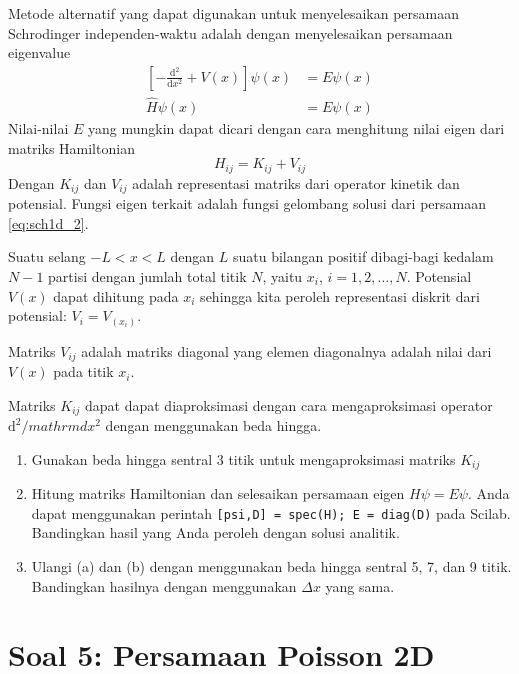 \documentclass[12pt,bahasa]{article}
\begin{document}
Metode alternatif
yang dapat digunakan untuk menyelesaikan persamaan
Schrodinger independen-waktu adalah dengan menyelesaikan
persamaan eigenvalue
\begin{align}
\left[-\frac{\mathrm{d}^2}{\mathrm{d}x^2} + V(x)\right]\psi(x) & = E\psi(x) \\
\hat{H}\psi(x) & = E \psi(x)
\end{align}
Nilai-nilai $E$ yang mungkin dapat dicari dengan cara menghitung
nilai eigen dari matriks Hamiltonian 
\begin{equation}
H_{ij} = K_{ij} + V_{ij}
\end{equation}
Dengan $K_{ij}$ dan $V_{ij}$ adalah representasi matriks dari operator
kinetik dan potensial.
Fungsi eigen terkait adalah fungsi gelombang solusi dari
persamaan \eqref{eq:sch1d_2}.

Suatu selang $-L < x < L$ dengan $L$ suatu bilangan positif
dibagi-bagi kedalam $N-1$ partisi dengan jumlah total titik $N$,
yaitu $x_{i}$, $i = 1, 2, \ldots, N$.
Potensial $V(x)$ dapat dihitung pada $x_{i}$ sehingga
kita peroleh representasi diskrit dari potensial:
$V_{i} = V_(x_{i})$.

Matriks $V_{ij}$ adalah matriks diagonal yang elemen diagonalnya adalah
nilai dari $V(x)$ pada titik $x_{i}$.

Matriks $K_{ij}$ dapat
dapat diaproksimasi dengan cara mengaproksimasi operator $\mathrm{d}^2/mathrm{d}x^2$
dengan menggunakan beda hingga.

\begin{enumerate}[label=(\alph*)]
\item Gunakan beda hingga sentral 3 titik untuk mengaproksimasi matriks $K_{ij}$
\item Hitung matriks Hamiltonian dan selesaikan persamaan eigen $H\psi = E\psi$. Anda dapat
menggunakan perintah \texttt{[psi,D] = spec(H); E = diag(D)} pada Scilab.
Bandingkan hasil yang Anda peroleh dengan solusi analitik.
\item Ulangi (a) dan (b) dengan menggunakan beda hingga sentral 5, 7, dan 9 titik.
Bandingkan hasilnya dengan menggunakan $\Delta x$ yang sama.
\end{enumerate}


\section{Soal 5: Persamaan Poisson 2D}
\end{document}
